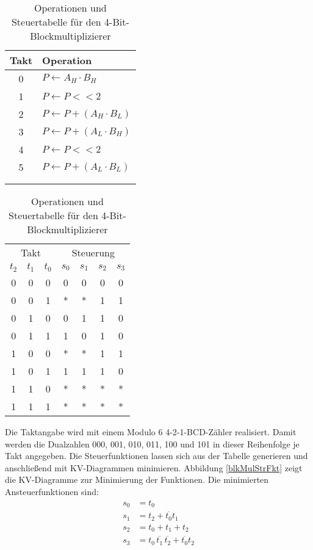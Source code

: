 \begin{table}[htp]
\centering
\begin{tabular}{c|l}
\\
Takt & Operation \\ \hline
0  & $P \leftarrow A_H \cdot B_H$ \\
1  & $P \leftarrow P << 2$ \\
2  & $P \leftarrow P + (A_H \cdot B_L)$ \\
3  & $P \leftarrow P + (A_L \cdot B_H)$ \\
4  & $P \leftarrow P << 2$ \\
5  & $P \leftarrow P + (A_L \cdot B_L)$ \\
\\
\\
\end{tabular}
\hspace{0.7cm}
\begin{tabular}{ccc|cccc}
\multicolumn{3}{c|}{Takt} & \multicolumn{4}{c}{Steuerung} \\
$t_2$ & $t_1$ & $t_0$ & $s_0$ & $s_1$ & $s_2$ & $s_3$ \\ \hline
0     & 0     & 0     & 0     & 0     & 0     & 0     \\
0     & 0     & 1     & *     & *     & 1     & 1     \\
0     & 1     & 0     & 0     & 1     & 1     & 0     \\
0     & 1     & 1     & 1     & 0     & 1     & 0     \\
1     & 0     & 0     & *     & *     & 1     & 1     \\
1     & 0     & 1     & 1     & 1     & 1     & 0     \\
1     & 1     & 0     & *     & *     & *     & *     \\
1     & 1     & 1     & *     & *     & *     & *     \\
\end{tabular}
\caption{Operationen und Steuertabelle für den 4-Bit-Blockmultiplizierer}
\label{blkMulTab}
\end{table}

Die Taktangabe wird mit einem Modulo 6 4-2-1-BCD-Zähler realisiert. Damit werden die Dualzahlen 000, 001, 010, 011, 100 und 101 in dieser Reihenfolge je Takt angegeben. Die Steuerfunktionen lassen sich aus der Tabelle generieren und anschließend mit KV-Diagrammen minimieren. Abbildung \ref{blkMulStrFkt} zeigt die KV-Diagramme zur Minimierung der Funktionen. Die minimierten Ansteuerfunktionen sind:
\begin{align*}
s_0 &= t_0 \\
s_1 &= t_2 + \overline{t_0} t_1 \\
s_2 &= t_0 + t_1 + t_2 \\
s_3 &= t_0\hspace{2pt} \overline{t_1} \hspace{2pt} \overline{t_2}  + \overline{t_0} t_2 \\
\end{align*}


